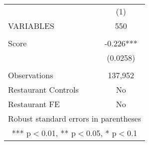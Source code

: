 \begin{tabular}{lc} \hline
 & (1) \\
VARIABLES & 550 \\ \hline
 &  \\
Score & -0.226*** \\
 & (0.0258) \\
 &  \\
Observations & 137,952 \\
Restaurant Controls & No \\
 Restaurant FE & No \\ \hline
\multicolumn{2}{c}{ Robust standard errors in parentheses} \\
\multicolumn{2}{c}{ *** p$<$0.01, ** p$<$0.05, * p$<$0.1} \\
\end{tabular}

